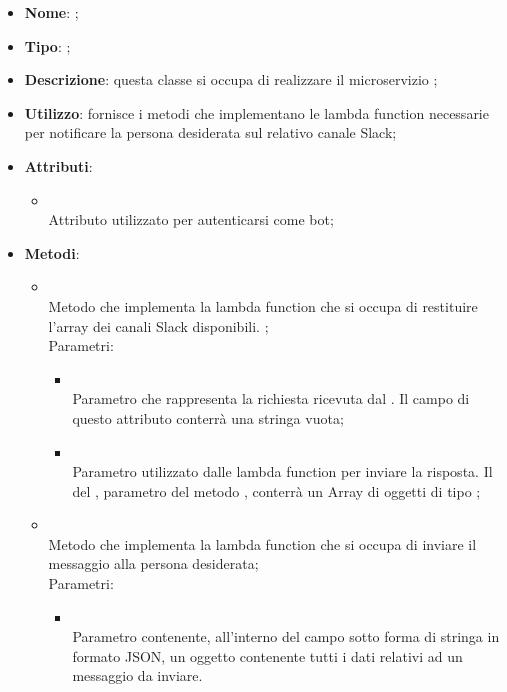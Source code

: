 \begin{itemize}
	\item \textbf{Nome}: ;
	\item \textbf{Tipo}: ;
	\item \textbf{Descrizione}: questa classe si occupa di realizzare il microservizio ;
	\item \textbf{Utilizzo}: fornisce i metodi che implementano le lambda function necessarie per notificare la persona desiderata sul relativo canale Slack;
	\item \textbf{Attributi}:
	\begin{itemize}
		\item[]  \\
		Attributo utilizzato per autenticarsi come bot;
	\end{itemize}
	\item \textbf{Metodi}:
	\begin{itemize}
		\item[]  \\
		Metodo che implementa la lambda function che si occupa di restituire l'array dei canali Slack disponibili. ;\\
		Parametri:
		\begin{itemize}
			\item {} \\
			Parametro che rappresenta la richiesta ricevuta dal . Il campo  di questo attributo conterrà una stringa vuota;
			\item {} \\
			Parametro utilizzato dalle lambda function per inviare la risposta. Il  del , parametro del metodo , conterrà un Array di oggetti di tipo ;
		\end{itemize}
		\item[]  \\
		Metodo che implementa la lambda function che si occupa di inviare il messaggio alla persona desiderata;\\
		Parametri:
		\begin{itemize}
			\item {} \\
			Parametro contenente, all'interno del campo  sotto forma di stringa in formato JSON, un oggetto contenente tutti i dati relativi ad un messaggio da inviare.

\end{itemize}
\end{itemize}
\end{itemize}
